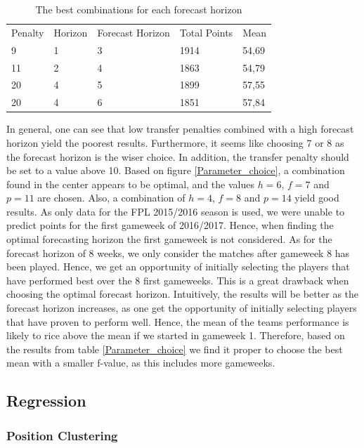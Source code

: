 \begin{table}[H]
\centering
\caption{The best combinations for each forecast horizon}
\label{tab:top_5}
\begin{tabular}{lllll}
Penalty & Horizon & Forecast Horizon & Total Points & Mean  \\
9       & 1       & 3                & 1914         & 54,69 \\
11      & 2       & 4                & 1863         & 54,79 \\
20      & 4       & 5                & 1899         & 57,55 \\
20      & 4       & 6                & 1851         & 57,84
\end{tabular}
\end{table}

In general, one can see that low transfer penalties combined with a high forecast horizon yield the poorest results. Furthermore, it seems like choosing 7 or 8 as the forecast horizon is the wiser choice. In addition, the transfer penalty should be set to a value above 10. Based on figure \ref{Parameter_choice}, a combination found in the center appears to be optimal, and the values $h = 6$, $f = 7$ and $p = 11$ are chosen. Also, a combination of $h = 4$, $f = 8$ and $p = 14$ yield good results. 
\newpar
As only data for the FPL 2015/2016 season is used, we were unable to predict points for the first gameweek of 2016/2017. Hence, when finding the optimal forecasting horizon the first gameweek is not considered. As for the forecast horizon of 8 weeks, we only consider the matches after gameweek 8 has been played. Hence, we get an opportunity of initially selecting the players that have performed best over the 8 first gameweeks. This is a great drawback when choosing the optimal forecast horizon. Intuitively, the results will be better as the forecast horizon increases, as one get the opportunity of initially selecting players that have proven to perform well. Hence, the mean of the teams performance is likely to rice above the mean if we started in gameweek 1. Therefore, based on the results from table \ref{Parameter_choice} we find it proper to choose the best mean with a smaller f-value, as this includes more gameweeks.  

\subsection{Regression}

\subsubsection{Position Clustering}

